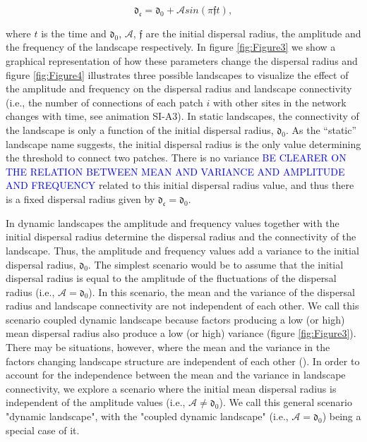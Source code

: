 \documentclass[12pt]{article}
\newcommand{\GM}[1]{\textcolor{Blue}{#1}}
\begin{document}
\begin{equation}
\mathfrak{d_{c}} = \mathfrak{d_{0}} + \mathcal{A} sin (\pi \mathfrak{f} t),
\label{eq:ratioAf}
\end{equation}

where $t$ is the time and $\mathfrak{d_{0}}$, $\mathcal{A}$, $\mathfrak{f}$ are the initial
dispersal radius, the amplitude and the frequency of the landscape respectively. In
figure \ref{fig:Figure3} we show a graphical representation of how these
parameters change the dispersal radius and figure \ref{fig:Figure4} illustrates three possible landscapes to visualize the effect of the amplitude and frequency on the dispersal radius and landscape
connectivity (i.e., the number of connections of each patch $i$ with other sites in
the network changes with time, see animation SI-A3). In static landscapes, the
connectivity of the landscape is only a function of the initial dispersal
radius, $\mathfrak{d_{0}}$. As the ``static'' landscape name suggests, the
initial dispersal radius is the only value determining the threshold to connect
two patches. There is no variance \GM{BE CLEARER ON THE RELATION BETWEEN MEAN AND VARIANCE AND AMPLITUDE AND FREQUENCY} related to this initial dispersal radius
value, and thus there is a fixed dispersal radius given by $\mathfrak{d_{c}} =
\mathfrak{d_{0}}$.

In dynamic landscapes the amplitude and frequency values
together with the initial dispersal radius determine the dispersal
radius and the connectivity of the landscape. Thus, the amplitude and frequency
values add a variance to the initial dispersal radius, $\mathfrak{d_{0}}$. The simplest scenario
would be to assume that the initial dispersal radius is equal to the
amplitude of the fluctuations of the dispersal radius (i.e.,
$\mathcal{A} = \mathfrak{d_{0}}$). In this scenario, the mean and the
variance of the dispersal radius and landscape connectivity are not
independent of each other. We call this scenario coupled dynamic
landscape because factors producing a low (or high) mean dispersal
radius also produce a low (or high) variance (figure \ref{fig:Figure3}). There may be
situations, however, where the mean and the variance in the factors
changing landscape structure are independent of each other
(\cite{Violletal2012}). In order to account for the independence between the mean and the variance in landscape connectivity, we explore a scenario where the initial mean dispersal radius is
independent of the amplitude values (i.e., $\mathcal{A} \neq
\mathfrak{d_{0}}$). We call this general scenario "dynamic landscape", with the "coupled dynamic landscape" (i.e., $\mathcal{A} = \mathfrak{d_{0}}$) being a special case of it.
\end{document}
